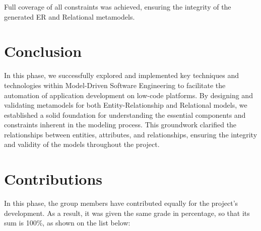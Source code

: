 \documentclass[10pt]{article}
\begin{document}
Full coverage of all constraints was achieved, ensuring the integrity of the generated ER and Relational metamodels.

\section{Conclusion}

In this phase, we successfully explored and implemented key techniques and technologies within Model-Driven Software Engineering to facilitate the automation of application development on low-code platforms. By designing and validating metamodels for both Entity-Relationship and Relational models, we established a solid foundation for understanding the essential components and constraints inherent in the modeling process. This groundwork clarified the relationships between entities, attributes, and relationships, ensuring the integrity and validity of the models throughout the project.

\section{Contributions}

In this phase, the group members have contributed equally for the project's development. As a result, it was given the same grade in percentage, so that its sum is 100\%, as shown on the list below:
\end{document}
